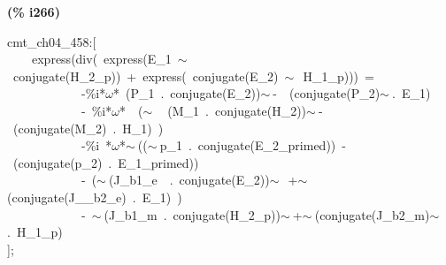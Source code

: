 \documentclass[fleqn]{article}
\begin{document}
\noindent
\begin{minipage}[t]{4.000000em}\color{red}\bfseries
(\% i266)	
\end{minipage}
\begin{minipage}[t]{\textwidth}\color{blue}
cmt\_ch04\_458:[\\
\ \ \ \ express(div(\ express(E\_1\ \ensuremath{\sim\ }\ conjugate(H\_2\_p))\ +\ express(\ conjugate(E\_2)\ \ensuremath{\sim\ }\ H\_1\_p)))\ =\ \\
\ \ \ \ \ \ \ \ \ \ \ \ -\%i*\ensuremath{\omega}*\ (P\_1\ .\ conjugate(E\_2))\ensuremath{\sim\ }-\ \ (conjugate(P\_2)\ensuremath{\sim\ }.\ E\_1)\\
\ \ \ \ \ \ \ \ \ \ \ \ -\ \%i*\ensuremath{\omega}*\ \ (\ensuremath{\sim\ }\ \ (M\_1\ .\ conjugate(H\_2))\ensuremath{\sim\ }-\ (conjugate(M\_2)\ .\ H\_1)\ )\ \\
\ \ \ \ \ \ \ \ \ \ \ \ -\%i\ *\ensuremath{\omega}*\ensuremath{\sim\ }((\ensuremath{\sim\ }p\_1\ .\ conjugate(E\_2\_primed))\ -\ (conjugate(p\_2)\ .\ E\_1\_primed))\\
\ \ \ \ \ \ \ \ \ \ \ \ -\ (\ensuremath{\sim\ }(J\_b1\_e\ \ .\ conjugate(E\_2))\ensuremath{\sim\ }\ +\ensuremath{\sim\ }(conjugate(J\_\_b2\_e)\ .\ E\_1)\ )\\
\ \ \ \ \ \ \ \ \ \ \ \ -\ \ensuremath{\sim\ }(J\_b1\_m\ .\ conjugate(H\_2\_p))\ensuremath{\sim\ }+\ensuremath{\sim\ }(conjugate(J\_b2\_m)\ensuremath{\sim\ }.\ H\_1\_p)\\
];
\end{minipage}
\end{document}
